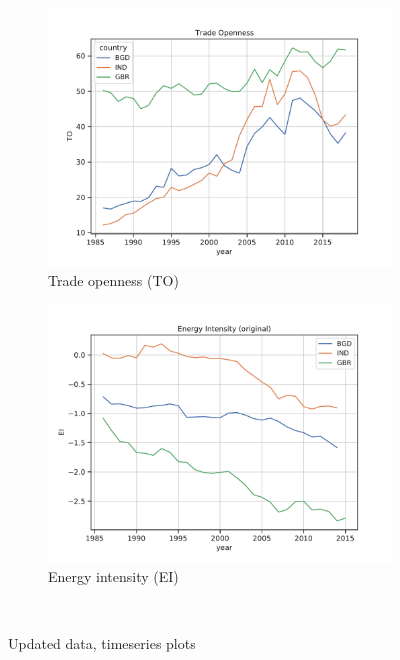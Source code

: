 \documentclass[11pt,a4paper]{article}
\begin{document}
\begin{figure}[htbp]
\centering
\begin{subfigure}{0.9\textwidth}
\includegraphics[width=\textwidth]{./plots/TO_timeseries.pdf}
\caption{Trade openness (TO)}
\end{subfigure}
\begin{subfigure}{0.9\textwidth}
\includegraphics[width=\textwidth]{./plots/EI_timeseries.pdf}
\caption{Energy intensity (EI)}
\end{subfigure}\\
\caption{Updated data, timeseries plots}
\label{fig:data_plots}
\end{figure}
\end{document}
